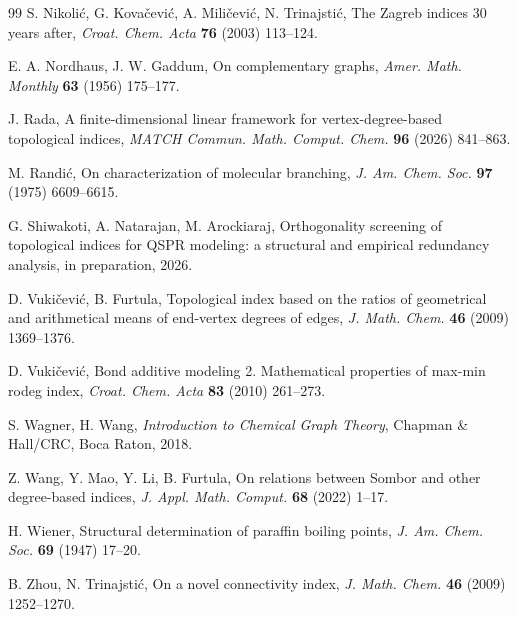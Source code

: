 \documentclass[a5paper, 10pt]{article}
\theoremstyle{plain}
\theoremstyle{remark}
\theoremstyle{definition}
\begin{document}
\begin{thebibliography}{99}
 S. Nikoli\'c,
    G. Kova\v{c}evi\'c, A. Mili\v{c}evi\'c, N. Trinajsti\'c,
    The Zagreb indices 30 years after,
    \textit{Croat. Chem. Acta\/} \textbf{76} (2003) 113--124.

 E. A. Nordhaus, J. W. Gaddum,
    On complementary graphs, \textit{Amer. Math. Monthly\/}
    \textbf{63} (1956) 175--177.

 J. Rada, A finite-dimensional linear
    framework for vertex-degree-based topological indices,
    \textit{MATCH Commun. Math. Comput. Chem.\/}
    \textbf{96} (2026) 841--863.

 M. Randi\'c, On characterization of
    molecular branching, \textit{J. Am. Chem. Soc.\/}
    \textbf{97} (1975) 6609--6615.

 G. Shiwakoti, A. Natarajan,
    M. Arockiaraj, Orthogonality screening of topological
    indices for QSPR modeling: a structural and empirical
    redundancy analysis, in preparation, 2026.

 D. Vuki\v{c}evi\'c, B. Furtula,
    Topological index based on the ratios of geometrical and
    arithmetical means of end-vertex degrees of edges,
    \textit{J. Math. Chem.\/} \textbf{46} (2009) 1369--1376.

 D. Vuki\v{c}evi\'c, Bond
    additive modeling 2. Mathematical properties of max-min
    rodeg index,
    \textit{Croat. Chem. Acta\/}
    \textbf{83} (2010) 261--273.

 S. Wagner, H. Wang,
    \textit{Introduction to Chemical Graph Theory\/},
    Chapman \& Hall/CRC, Boca Raton, 2018.

 Z. Wang, Y. Mao,
    Y. Li, B. Furtula, On relations between Sombor and other
    degree-based indices,
    \textit{J. Appl. Math. Comput.\/}
    \textbf{68} (2022) 1--17.

 H. Wiener, Structural determination of
    paraffin boiling points, \textit{J. Am. Chem. Soc.\/}
    \textbf{69} (1947) 17--20.

 B. Zhou, N. Trinajsti\'c,
    On a novel connectivity index, \textit{J. Math. Chem.\/}
    \textbf{46} (2009) 1252--1270.

\end{thebibliography}
\end{document}
